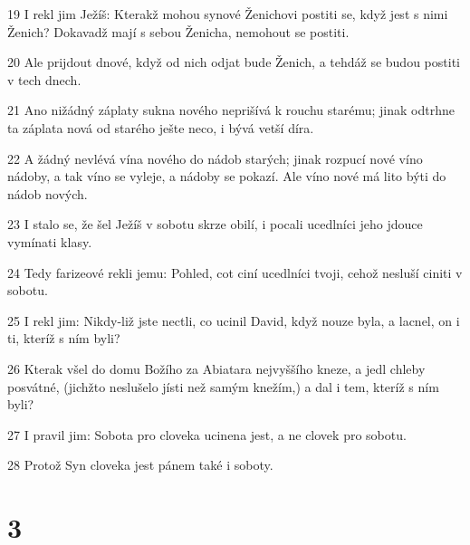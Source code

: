 \par 19 I rekl jim Ježíš: Kterakž mohou synové Ženichovi postiti se, když jest s nimi Ženich? Dokavadž mají s sebou Ženicha, nemohout se postiti.
\par 20 Ale prijdout dnové, když od nich odjat bude Ženich, a tehdáž se budou postiti v tech dnech.
\par 21 Ano nižádný záplaty sukna nového neprišívá k rouchu starému; jinak odtrhne ta záplata nová od starého ješte neco, i bývá vetší díra.
\par 22 A žádný nevlévá vína nového do nádob starých; jinak rozpucí nové víno nádoby, a tak víno se vyleje, a nádoby se pokazí. Ale víno nové má lito býti do nádob nových.
\par 23 I stalo se, že šel Ježíš v sobotu skrze obilí, i pocali ucedlníci jeho jdouce vymínati klasy.
\par 24 Tedy farizeové rekli jemu: Pohled, cot ciní ucedlníci tvoji, cehož nesluší ciniti v sobotu.
\par 25 I rekl jim: Nikdy-liž jste nectli, co ucinil David, když nouze byla, a lacnel, on i ti, kteríž s ním byli?
\par 26 Kterak všel do domu Božího za Abiatara nejvyššího kneze, a jedl chleby posvátné, (jichžto neslušelo jísti než samým knežím,) a dal i tem, kteríž s ním byli?
\par 27 I pravil jim: Sobota pro cloveka ucinena jest, a ne clovek pro sobotu.
\par 28 Protož Syn cloveka jest pánem také i soboty.

\chapter{3}

